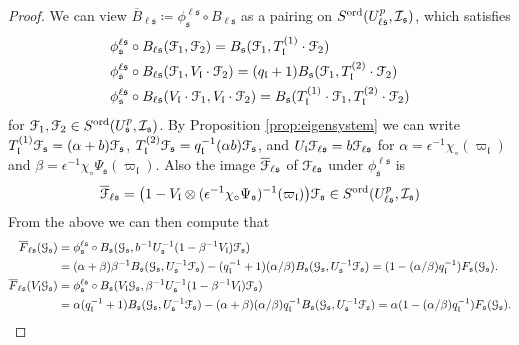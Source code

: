 \documentclass[leqno]{amsart}
\theoremstyle{definition}
\theoremstyle{remark}
\newcommand{\fl}{\mathfrak{l}}
\newcommand{\fn}{\mathfrak{n}}
\newcommand{\fs}{\mathfrak{s}}
\newcommand{\euF}{\EuScript{F}} %
\newcommand{\I}{\mathcal{I}} %
\newcommand{\ord}{\textnormal{ord}} %
\begin{document}
\begin{proof}
We can view $\overline{B}_{\ell\fs}\coloneqq
\phi^{\ell\fs}_\fs\circ B_{\ell\fs}$
as a pairing on $S^{\ord}(U^p_{\ell\fs},\I_\fs)$,
which satisfies
\begin{align*}
	&\phi^{\ell\fs}_\fs\circ B_{\ell\fs}(\euF_1,\euF_2)=
	B_{\fs}(\euF_1,T_{\fl}^{(1)}\cdot \euF_2)\\
	&\phi^{\ell\fs}_\fs\circ B_{\ell\fs}(\euF_1,V_{\fl}\cdot\euF_2)=
	(q_\fl+1) B_{\fs}(\euF_1, T_{\fl}^{(2)}\cdot\euF_2)\\
	&\phi^{\ell\fs}_\fs\circ B_{\ell\fs}
	(V_{\fl}\cdot \euF_1,V_{\fl}\cdot\euF_2)=
	B_{\fs} (T_{\fl}^{(1)}\cdot\euF_1,
	T_{\fl}^{(2)}\cdot \euF_2)
\end{align*} 
for $\euF_1,\euF_2\in S^{\ord}(U^p_\fs,\I_\fs)$.
By Proposition \ref{prop:eigensystem}
we can write $T_\fl^{(1)}\euF_\fs=(\alpha+b)\euF_\fs$,
$T_\fl^{(2)}\euF_\fs=q_\fl^{-1}(\alpha b)\euF_\fs$, and
$U_\fl\euF_{\ell\fs}=b\euF_{\ell\fs}$ for
$\alpha=\epsilon^{-1}\chi_\circ(\varpi_\fl)$ 
and $\beta=\epsilon^{-1}\chi_\circ\Psi_\fs(\varpi_\fl)$.
Also the image $\overline{\euF}_{\ell\fs}$ of 
$\euF_{\ell\fs}$ under $\phi^{\ell\fs}_{\fs}$ is
\begin{equation}\label{eq:compare_level}
    \overline{\euF}_{\ell\fs}=
	\big(1-V_\fl\otimes
    (\epsilon^{-1}\chi_\circ\Psi_\fs)^{-1}(\varpi_\fl)\big)
	\euF_{\fs}
    \in S^{\ord}(U^p_{\ell\fs},\I_\fs)
\end{equation}
From the above we can then compute that 
\begin{align*}
\overline{F}_{\ell\fs}(\EuScript{G}_{\fs})&=
\phi^{\ell\fs}_\fs\circ B_\fs(\EuScript{G}_{\fs},
b^{-1}U_\fs^{-1}(1-\beta^{-1}V_\fl)\euF_\fs)\\&=
(\alpha+\beta)\beta^{-1}
B_\fs(\EuScript{G}_{\fs},U_\fs^{-1}\euF_\fs)-
(q_\fl^{-1}+1)(\alpha/\beta)
B_\fs(\EuScript{G}_{\fs}, U_\fs^{-1}\euF_\fs)=
(1-(\alpha/\beta)q_\fl^{-1})F_\fs(\EuScript{G}_\fs).\\
\overline{F}_{\ell\fs}(V_\fl\EuScript{G}_{\fs})&=
\phi^{\ell\fs}_\fs\circ B_\fs(V_\fl\EuScript{G}_{\fs},
\beta^{-1}U_\fs^{-1}(1-\beta^{-1}V_\fl)\euF_\fs)\\&=
\alpha(q_\fl^{-1}+1)
B_\fs(\EuScript{G}_{\fs},U_\fs^{-1}\euF_\fs)-
(\alpha+\beta)(\alpha/\beta)q_\fl^{-1}
B_\fs(\EuScript{G}_{\fs}, U_\fs^{-1}\euF_\fs)=
\alpha(1-(\alpha/\beta)q_\fl^{-1})F_\fs(\EuScript{G}_\fs).
\end{align*}

\end{proof}
\end{document}
